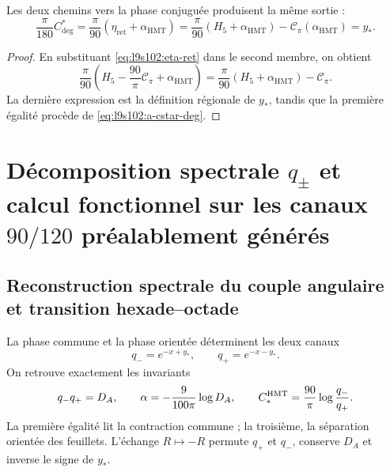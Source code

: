 \begin{theorem}
\label{thm:l9s102:conmutatividad-cstar}
Les deux chemins vers la phase conjuguée produisent la même sortie :
\begin{equation}
 \boxed{
 \frac\pi{180}C^*_{\deg}
 =\frac\pi{90}(\eta_{\mathrm{ret}}+\alpha_{\mathrm{HMT}})
 =\frac\pi{90}(H_5+\alpha_{\mathrm{HMT}})
 -\mathscr C_\pi(\alpha_{\mathrm{HMT}})=y_*.}
 \label{eq:l9s102:cuadrado-cstar}
\end{equation}
\end{theorem}

\begin{proof}
En substituant \cref{eq:l9s102:eta-ret} dans le second membre, on obtient
\[
 \frac\pi{90}
 \left(H_5-\frac{90}{\pi}\mathscr C_\pi+\alpha_{\mathrm{HMT}}\right)
 =\frac\pi{90}(H_5+\alpha_{\mathrm{HMT}})-\mathscr C_\pi.
\]
La dernière expression est la définition régionale de \(y_*\), tandis que la
première égalité procède de \cref{eq:l9s102:a-cstar-deg}.
\end{proof}

\section{Décomposition spectrale \texorpdfstring{\(q_\pm\)}{q+/-} et calcul fonctionnel sur les canaux \texorpdfstring{\(90/120\)}{90/120} préalablement générés}
\label{sec:s102:c38:6}

\subsection{Reconstruction spectrale du couple angulaire et transition hexade--octade}
\label{sec:s102:c38:6:1}


La phase commune et la phase orientée déterminent les deux canaux
\[
q_-=e^{-x+y_*},
\qquad
q_+=e^{-x-y_*}.
\]
On retrouve exactement les invariants
\[
q_-q_+=D_A,
\qquad
\alpha=-\frac9{100\pi}\log D_A,
\qquad
C_*^{\rm HMT}=\frac{90}{\pi}\log\frac{q_-}{q_+}.
\]
La première égalité lit la contraction commune ; la troisième, la séparation
orientée des feuillets. L'échange \(R\mapsto-R\) permute
\(q_+\) et \(q_-\), conserve \(D_A\) et inverse le signe de \(y_*\).

